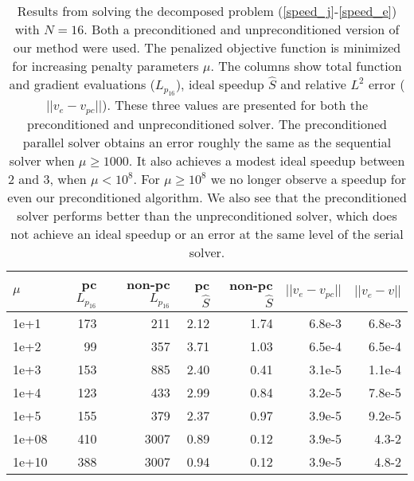 \begin{table}[h]
\centering
\caption{Results from solving the decomposed problem (\ref{speed_j}-\ref{speed_e}) with $N=16$. Both a preconditioned and unpreconditioned version of our method were used. The penalized objective function is minimized for increasing penalty parameters $\mu$. The columns show total function and gradient evaluations ($L_{p_{16}}$), ideal speedup $\hat S$ and relative $L^2$ error ($||v_e-v_{pc}||$). These three values are presented for both the preconditioned and unpreconditioned solver. The preconditioned parallel solver obtains an error roughly the same as the sequential solver when $\mu\geq 1000$. It also achieves a modest ideal speedup between 2 and 3, when $\mu< 10^8$. For $\mu\geq10^8$ we no longer observe a speedup for even our preconditioned algorithm.  We also see that the preconditioned solver performs better than the unpreconditioned solver, which does not achieve an ideal speedup or an error at the same level of the serial solver.}
\label{mu2}
\begin{tabular}{lrrrrrr}
\toprule
{} $\mu$&    pc $L_{p_{16}}$ & non-pc $L_{p_{16}}$  &  pc $\hat S$ & non-pc $\hat S$ &  $||v_e-v_{pc}||$ &      $||v_e-v||$\\
\midrule
1e+1     &  173 &  211 &  2.12&  1.74 &  6.8e-3 &  6.8e-3 \\
1e+2   &   99 &  357 &  3.71 &  1.03 &  6.5e-4 &   6.5e-4\\
1e+3  &  153 &  885 &  2.40 &  0.41 &  3.1e-5 &  1.1e-4 \\
1e+4 &  123 &  433&  2.99 &  0.84 &  3.2e-5 &  7.8e-5 \\
1e+5 &  155 &  379 &  2.37 &  0.97 &  3.9e-5 &  9.2e-5 \\
1e+08 &  410 &  3007 &  0.89 &  0.12 &  3.9e-5 &  4.3-2 \\
1e+10 &  388 &  3007 &  0.94 &  0.12 &  3.9e-5 &  4.8-2 \\
\bottomrule
\end{tabular}
\\
\end{table}
